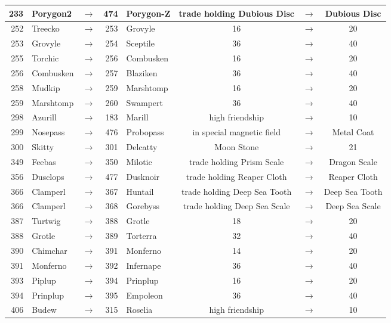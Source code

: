 \documentclass{article}
\begin{document}
\begin{longtable}{rlcrl|ccc}
233 & Porygon2 & $\rightarrow$ & 474 & Porygon-Z & trade holding Dubious Disc & $\rightarrow$ & Dubious Disc \\
\hline %
252 & Treecko & $\rightarrow$ & 253 & Grovyle & 16 & $\rightarrow$ & 20 \\
253 & Grovyle & $\rightarrow$ & 254 & Sceptile & 36 & $\rightarrow$ & 40 \\
255 & Torchic & $\rightarrow$ & 256 & Combusken & 16 & $\rightarrow$ & 20 \\
256 & Combusken & $\rightarrow$ & 257 & Blaziken & 36 & $\rightarrow$ & 40 \\
258 & Mudkip & $\rightarrow$ & 259 & Marshtomp & 16 & $\rightarrow$ & 20 \\
259 & Marshtomp & $\rightarrow$ & 260 & Swampert & 36 & $\rightarrow$ & 40 \\
298 & Azurill & $\rightarrow$ & 183 & Marill & high friendship & $\rightarrow$ & 10 \\
299 & Nosepass & $\rightarrow$ & 476 & Probopass & in special magnetic field & $\rightarrow$ & Metal Coat \\
300 & Skitty & $\rightarrow$ & 301 & Delcatty & Moon Stone & $\rightarrow$ & 21 \\
349 & Feebas & $\rightarrow$ & 350 & Milotic & trade holding Prism Scale & $\rightarrow$ & Dragon Scale \\
356 & Dusclops & $\rightarrow$ & 477 & Dusknoir & trade holding Reaper Cloth & $\rightarrow$ & Reaper Cloth \\
366 & Clamperl & $\rightarrow$ & 367 & Huntail & trade holding Deep Sea Tooth & $\rightarrow$ & Deep Sea Tooth \\
366 & Clamperl & $\rightarrow$ & 368 & Gorebyss & trade holding Deep Sea Scale & $\rightarrow$ & Deep Sea Scale \\
\hline %
387 & Turtwig & $\rightarrow$ & 388 & Grotle & 18 & $\rightarrow$ & 20 \\
388 & Grotle & $\rightarrow$ & 389 & Torterra & 32 & $\rightarrow$ & 40 \\
390 & Chimchar & $\rightarrow$ & 391 & Monferno & 14 & $\rightarrow$ & 20 \\
391 & Monferno & $\rightarrow$ & 392 & Infernape & 36 & $\rightarrow$ & 40 \\
393 & Piplup & $\rightarrow$ & 394 & Prinplup & 16 & $\rightarrow$ & 20 \\
394 & Prinplup & $\rightarrow$ & 395 & Empoleon & 36 & $\rightarrow$ & 40 \\
406 & Budew & $\rightarrow$ & 315 & Roselia & high friendship & $\rightarrow$ & 10 \\

\end{longtable}
\end{document}
